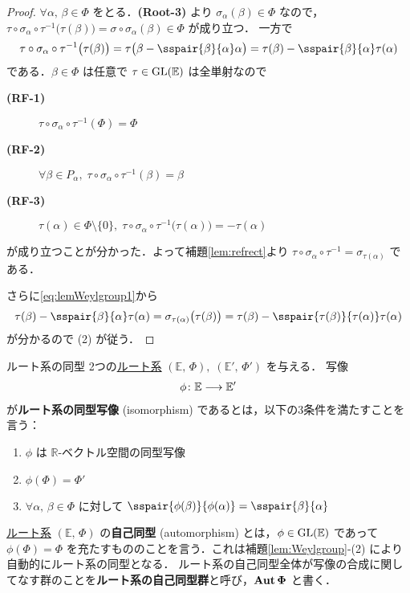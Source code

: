 \documentclass[rep_main]{subfiles}
\begin{document}
\begin{proof}
	$\forall \alpha,\, \beta \in \Phi$ をとる．\textsf{\textbf{(Root-3)}} より $\sigma_\alpha(\beta) \in \Phi$ なので，$\tau \circ \sigma_\alpha \circ \tau^{-1}\bigl(\tau(\beta)\bigr) = \sigma \circ \sigma_\alpha(\beta) \in \Phi$ が成り立つ．
	一方で
	\begin{align}
		\label{eq:lemWeylgroup1}
		\tau \circ \sigma_\alpha \circ \tau^{-1}\bigl(\tau(\beta)\bigr) = \tau \bigl( \beta - \sspair{\beta}{\alpha}\alpha \bigr) = \tau(\beta) - \sspair{\beta}{\alpha}\tau(\alpha)
	\end{align}
	である．$\beta \in \Phi$ は任意で $\tau \in \mathrm{GL}(\mathbb{E})$ は全単射なので 
	\begin{description}
		\item[\textbf{(RF-1)}] $\tau \circ \sigma_\alpha \circ \tau^{-1} (\Phi) = \Phi$
		\item[\textbf{(RF-2)}] $\forall \beta \in P_\alpha,\; \tau \circ \sigma_\alpha \circ \tau^{-1}(\beta) = \beta$
		\item[\textbf{(RF-3)}] $\tau(\alpha) \in \Phi \setminus \{0\},\; \tau \circ \sigma_\alpha \circ \tau^{-1} \bigl( \tau(\alpha) \bigr) = -\tau(\alpha)$
	\end{description}
	が成り立つことが分かった．よって補題\ref{lem:refrect}より $\tau \circ \sigma_\alpha \circ \tau^{-1} = \sigma_{\tau(\alpha)}$ である．
	
	さらに\eqref{eq:lemWeylgroup1}から
	\begin{align}
		\tau(\beta) - \sspair{\beta}{\alpha}\tau(\alpha) = \sigma_{\tau(\alpha)} \bigl(\tau(\beta)\bigr) = \tau(\beta) - \sspair{\tau(\beta)}{\tau(\alpha)} \tau(\alpha)
	\end{align}
	が分かるので (2) が従う．
\end{proof}

\begin{mydef}[label=def:isom-root]{ルート系の同型}
	2つの\hyperref[ax:root-system]{ルート系} $(\mathbb{E},\, \Phi),\; (\mathbb{E}',\, \Phi')$ を与える．
	写像
	\begin{align}
		\phi \colon \mathbb{E} \longrightarrow \mathbb{E}'
	\end{align}
	が\textbf{ルート系の同型写像} (isomorphism) であるとは，以下の3条件を満たすことを言う：
	\begin{enumerate}
		\item $\phi$ は $\mathbb{R}$-ベクトル空間の同型写像
		\item $\phi(\Phi) = \Phi'$
		\item $\forall \alpha,\, \beta \in \Phi$ に対して $\sspair{\phi(\beta)}{\phi(\alpha)} = \sspair{\beta}{\alpha}$
	\end{enumerate}
	\tcblower
	\hyperref[ax:root-system]{ルート系} $(\mathbb{E},\, \Phi)$ の\textbf{自己同型} (automorphism) とは，$\phi \in \mathrm{GL}(\mathbb{E})$ であって $\phi(\Phi) = \Phi$ を充たすもののことを言う．これは補題\ref{lem:Weylgroup}-(2) により自動的にルート系の同型となる．
	ルート系の自己同型全体が写像の合成に関してなす群のことを\textbf{ルート系の自己同型群}と呼び，$\bm{\Aut \Phi}$ と書く．
\end{mydef}
\end{document}
